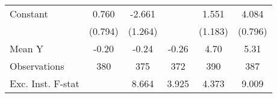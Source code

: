{\begin{tabular}{l*{5}{c}}
\addlinespace
Constant            &       0.760         &      -2.661\sym{**} &                     &       1.551         &       4.084\sym{***}\\
                    &     (0.794)         &     (1.264)         &                     &     (1.183)         &     (0.796)         \\
\midrule
Mean Y              &       -0.20         &       -0.24         &       -0.26         &        4.70         &        5.31         \\
Observations        &         380         &         375         &         372         &         390         &         387         \\
Exc. Inst. F-stat   &                     &       8.664         &       3.925         &       4.373         &       9.009         \\
\bottomrule
\end{tabular}
}
